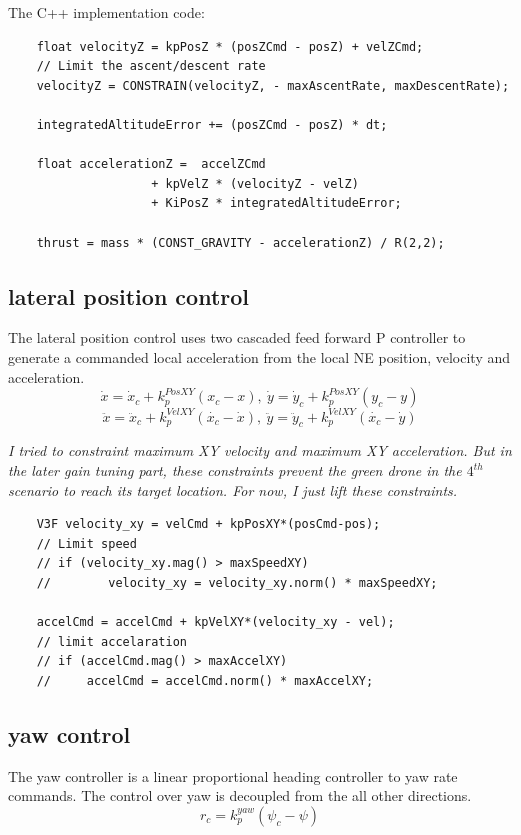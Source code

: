 \documentclass[a4paper]{article}
\begin{document}
The C++ implementation code:
\begin{lstlisting}
    float velocityZ = kpPosZ * (posZCmd - posZ) + velZCmd;
    // Limit the ascent/descent rate
    velocityZ = CONSTRAIN(velocityZ, - maxAscentRate, maxDescentRate);
    
    integratedAltitudeError += (posZCmd - posZ) * dt;
    
    float accelerationZ =  accelZCmd
                    + kpVelZ * (velocityZ - velZ)
                    + KiPosZ * integratedAltitudeError;
    
    thrust = mass * (CONST_GRAVITY - accelerationZ) / R(2,2);

\end{lstlisting}

\subsection{lateral position control}
The lateral position control uses two cascaded feed forward P controller to generate a commanded local acceleration from the local NE position, velocity and acceleration.
$$\dot{x} = \dot{x}_c  + k_{p}^{PosXY}(x_{c} - x), \:
  \dot{y} = \dot{y}_c  + k_{p}^{PosXY}(y_{c} - y)$$
$$\ddot{x} = \ddot{x}_c  + k_{p}^{VelXY}(\dot{x_{c}} - \dot{x}), \:
  \ddot{y} = \ddot{y}_c  + k_{p}^{VelXY}(\dot{x_{c}} - \dot{y})$$

\textit{I tried to constraint maximum XY velocity and maximum XY acceleration. But in the later gain tuning part, these constraints prevent the green drone in the $4^{th}$ scenario to reach its target location. For now, I just lift these constraints.}

\begin{lstlisting}
    V3F velocity_xy = velCmd + kpPosXY*(posCmd-pos);
    // Limit speed
    // if (velocity_xy.mag() > maxSpeedXY)
    //        velocity_xy = velocity_xy.norm() * maxSpeedXY;
    
    accelCmd = accelCmd + kpVelXY*(velocity_xy - vel);
    // limit accelaration
    // if (accelCmd.mag() > maxAccelXY)
    //     accelCmd = accelCmd.norm() * maxAccelXY;
\end{lstlisting}

\subsection{yaw control}
The yaw controller is a linear proportional heading controller to yaw rate commands.
The control over yaw is decoupled from the all other directions.
$$ r_c = k_p^{yaw} (\psi_c - \psi) $$
\end{document}
